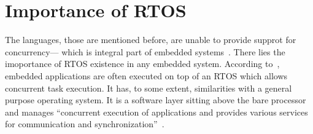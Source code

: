 \section{Importance of RTOS}
The languages, those are mentioned before, are unable to provide supprot for concurrency--- which is integral part of embedded systems~\cite{Gajski.2009}. There lies the imoportance of RTOS existence in any embedded system. According to~\cite{Gajski.2009}, embedded applications are often executed on top of an RTOS which allows concurrent task execution. It has, to some extent, similarities with a general purpose operating system. It is a software layer sitting above the bare processor and manages ``concurrent execution of applications and provides various services for communication and synchronization''~\cite{Gajski.2009}.
